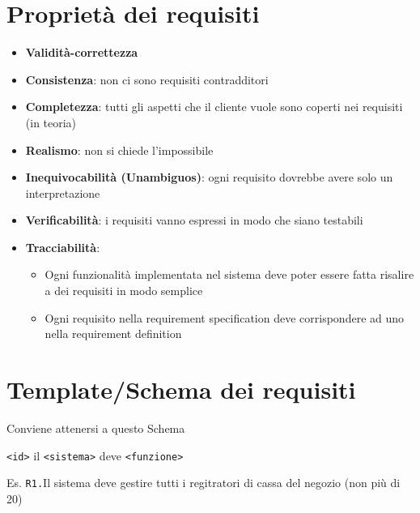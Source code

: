 \documentclass[12pt, a4paper]{report}
\begin{document}
\section{Proprietà dei requisiti}
\begin{itemize}
    \item \textbf{Validità-correttezza}
    \item \textbf{Consistenza}: non ci sono requisiti contradditori
    \item \textbf{Completezza}: tutti gli aspetti che il cliente vuole sono coperti nei requisiti (in teoria)
    \item \textbf{Realismo}: non si chiede l'impossibile
    \item \textbf{Inequivocabilità (Unambiguos)}: ogni requisito dovrebbe avere solo un interpretazione
    \item \textbf{Verificabilità}: i requisiti vanno espressi in modo che siano testabili
    \item \textbf{Tracciabilità}: \begin{itemize}
        \item Ogni funzionalità implementata nel sistema deve poter essere fatta risalire a dei requisiti in modo semplice
        \item Ogni requisito nella requirement specification deve corrispondere ad uno nella requirement definition
    \end{itemize}
\end{itemize}
\section{Template/Schema dei requisiti}
Conviene attenersi a questo Schema
\begin{center}
    \large
    \texttt{<id>} il \texttt{<sistema>} deve \texttt{<funzione>}
\end{center}
Es. \texttt{R1.}Il sistema deve gestire tutti i regitratori di cassa del negozio (non più di 20)
\end{document}
